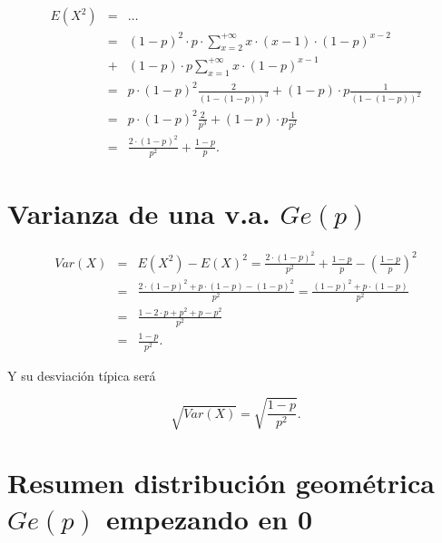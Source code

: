 \documentclass[
  letterpaper,
  DIV=11,
  numbers=noendperiod]{scrreprt}
\begin{document}
\begin{eqnarray*}
E(X^2)&=&\ldots\\
&=&
(1-p)^{2}\cdot p\cdot \sum_{x=2}^{+\infty} x\cdot (x-1)\cdot (1-p)^{x-2}\\ 
&  +&   (1-p)\cdot p\sum_{x=1}^{+\infty} x \cdot (1-p)^{x-1}\\
&=&
p\cdot (1-p)^2 \frac{2}{(1-(1-p))^3}+  (1-p)\cdot p \frac{1}{(1-(1-p))^2}\\
&=&
p\cdot (1-p)^2 \frac{2}{p^3}+  (1-p)\cdot p \frac{1}{p^2}\\
&=&\frac{2\cdot (1-p)^2}{p^2}+\frac{1-p}{p}.
\end{eqnarray*}

\section{\texorpdfstring{Varianza de una v.a.
\(Ge(p)\)}{Varianza de una v.a. Ge(p)}}\label{varianza-de-una-v.a.-gep}

\begin{eqnarray*}
Var(X)&=&E(X^2)-E(X)^2=\frac{2\cdot (1-p)^2}{p^2}+\frac{1-p}{p}-\left(\frac{1-p}{p}\right)^2\\
&=&
\frac{2\cdot (1-p)^2+p\cdot(1-p)-(1-p)^2}{p^2}=\frac{(1-p)^2+p\cdot(1-p)}{p^2}\\
&=&
\frac{1-2\cdot p + p^2+p-p^2}{p^2}\\
&=& \frac{1-p}{p^2}.
\end{eqnarray*}

Y su desviación típica será

\[\sqrt{Var(X)}=\sqrt{\frac{1-p}{p^2}}.\]

\section{\texorpdfstring{Resumen distribución geométrica \(Ge(p)\)
empezando en
0}{Resumen distribución geométrica Ge(p) empezando en 0}}\label{resumen-distribuciuxf3n-geomuxe9trica-gep-empezando-en-0}
\end{document}
